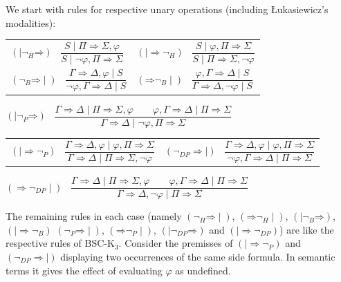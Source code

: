 \documentclass[11pt,a4paper,titlepage]{article}
\theoremstyle{definition}
\newcommand{\3}{\vspace{.3in}}
\newcommand{\2}{\vspace{.2in}}
\newcommand{\1}{\vspace{.1in}}
\newcommand{\5}{\vspace{.05in}}
\begin{document}
We start with rules for respective unary operations (including \L u\-ka\-sie\-wicz's modalities):



\1

\noindent\begin{tabular}{ll}

	$(\mathord{\mid\neg_H}\mathord{\Rightarrow})$ \ $\dfrac{S \mid \Pi\Rightarrow\Sigma, \varphi}{S \mid \neg\varphi, \Pi\Rightarrow\Sigma}$ &
	$(\mathord{\mid\Rightarrow}\mathord{\neg_H})$ \ $\dfrac{S \mid \varphi, \Pi\Rightarrow\Sigma}{S \mid \Pi\Rightarrow\Sigma, \neg\varphi}$\\[16pt]
	
	
	$(\mathord{\neg_B}\mathord{\Rightarrow}\mid)$ \ $\dfrac{\Gamma
		\Rightarrow \Delta, \varphi \mid S}{\neg \varphi, \Gamma \Rightarrow \Delta \mid S}$ &
	$(\mathord{\Rightarrow}\mathord{\neg_B}\mid)$ \ $\dfrac{\varphi, \Gamma
		\Rightarrow \Delta \mid S}{\Gamma
		\Rightarrow \Delta, \neg\varphi\mid S}$\\[16pt]
	
\end{tabular}	

$(\mathord{\mid\neg_P}\mathord{\Rightarrow})$ \ $\dfrac{\Gamma
	\Rightarrow \Delta \mid \Pi\Rightarrow\Sigma, \varphi \qquad \varphi, \Gamma\Rightarrow\Delta \mid \Pi\Rightarrow\Sigma}{\Gamma \Rightarrow \Delta \mid \neg\varphi, \Pi\Rightarrow\Sigma}$ 

\1

\noindent\begin{tabular}{ll}
	
	
	$(\mathord{\mid\Rightarrow}\mathord{\neg_P})$ \ $\dfrac{\Gamma
		\Rightarrow \Delta, \varphi \mid \varphi, \Pi\Rightarrow\Sigma}{\Gamma
		\Rightarrow \Delta \mid \Pi\Rightarrow\Sigma, \neg\varphi}$ &
	$(\mathord{\neg_{DP}}\mathord{\Rightarrow\mid})$ \ $\dfrac{\Gamma
		\Rightarrow \Delta, \varphi \mid \varphi, \Pi\Rightarrow\Sigma}{\neg\varphi, \Gamma
		\Rightarrow \Delta \mid \Pi\Rightarrow\Sigma}$
	
\end{tabular}	

\1

$(\mathord{\Rightarrow\neg_{DP}\mid})$ \ $\dfrac{\Gamma
	\Rightarrow \Delta \mid \Pi\Rightarrow\Sigma, \varphi \qquad \varphi, \Gamma\Rightarrow\Delta \mid \Pi\Rightarrow\Sigma}{\Gamma \Rightarrow \Delta, \neg\varphi \mid \Pi\Rightarrow\Sigma}$ 


\1

The remaining rules in each case (namely $(\mathord{\neg_H}\mathord{\Rightarrow}\!\mid)$, $(\mathord{\Rightarrow}\mathord{\neg_H}\!\mid)$, $(\mathord{\mid\!\neg_B}\mathord{\Rightarrow})$, $(\mathord{\mid\Rightarrow}\mathord{\neg_B})$ $(\mathord{\neg_P}\mathord{\Rightarrow}\mid)$, $(\mathord{\Rightarrow}\mathord{\neg_P}\mid)$, $(\mathord{\mid\neg_{DP}}\mathord{\Rightarrow})$ and $(\mathord{\mid\Rightarrow}\mathord{\neg_{DP}})$) are like the respective rules of
BSC-K$_3$. Consider the premisses of $(\mathord{\mid\Rightarrow}\mathord{\neg_P})$ and $(\mathord{\neg_{DP}}\mathord{\Rightarrow\mid})$ displaying two occurrences of the same side formula. In semantic terms it gives the effect of evaluating $\varphi$ as undefined.
\end{document}
